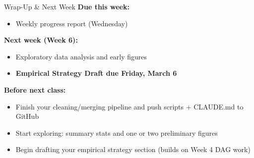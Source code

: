 \begin{frame}{Wrap-Up \& Next Week}
  \textbf{Due this week:}
  \begin{itemize}
    \item Weekly progress report (Wednesday)
  \end{itemize}

  \vspace{8pt}

  \textbf{Next week (Week 6):}
  \begin{itemize}
    \item Exploratory data analysis and early figures
    \item \textbf{Empirical Strategy Draft due Friday, March 6}
  \end{itemize}

  \vspace{8pt}

  \textbf{Before next class:}
  \begin{itemize}
    \item Finish your cleaning/merging pipeline and push scripts + CLAUDE.md to GitHub
    \item Start exploring: summary stats and one or two preliminary figures
    \item Begin drafting your empirical strategy section (builds on Week 4 DAG work)
  \end{itemize}
\end{frame}


